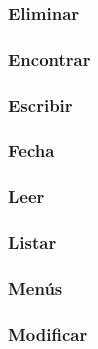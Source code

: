 \bigskip
%

\subsubsection{Eliminar}

\bigskip
%

\subsubsection{Encontrar}

\bigskip
%

\subsubsection{Escribir}

\bigskip
%

\subsubsection{Fecha}

\bigskip
%

\subsubsection{Leer}

\bigskip


\subsubsection{Listar}

\bigskip
%

\subsubsection{Menús}

\bigskip
%

\subsubsection{Modificar}


